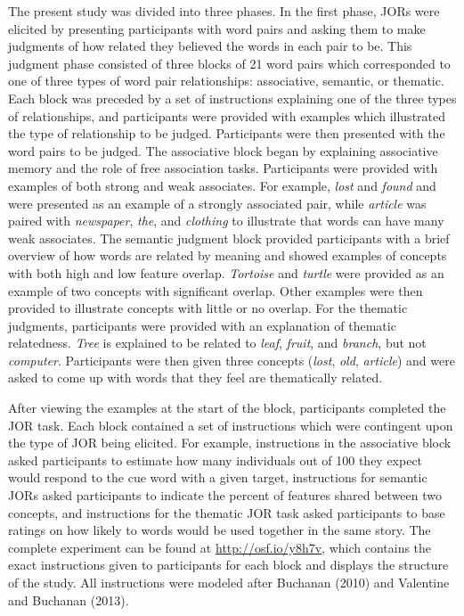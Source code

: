 \documentclass[english,,man]{apa6}
\begin{document}
The present study was divided into three phases. In the first phase,
JORs were elicited by presenting participants with word pairs and asking
them to make judgments of how related they believed the words in each
pair to be. This judgment phase consisted of three blocks of 21 word
pairs which corresponded to one of three types of word pair
relationships: associative, semantic, or thematic. Each block was
preceded by a set of instructions explaining one of the three types of
relationships, and participants were provided with examples which
illustrated the type of relationship to be judged. Participants were
then presented with the word pairs to be judged. The associative block
began by explaining associative memory and the role of free association
tasks. Participants were provided with examples of both strong and weak
associates. For example, \emph{lost} and \emph{found} and were presented
as an example of a strongly associated pair, while \emph{article} was
paired with \emph{newspaper}, \emph{the}, and \emph{clothing} to
illustrate that words can have many weak associates. The semantic
judgment block provided participants with a brief overview of how words
are related by meaning and showed examples of concepts with both high
and low feature overlap. \emph{Tortoise} and \emph{turtle} were provided
as an example of two concepts with significant overlap. Other examples
were then provided to illustrate concepts with little or no overlap. For
the thematic judgments, participants were provided with an explanation
of thematic relatedness. \emph{Tree} is explained to be related to
\emph{leaf}, \emph{fruit}, and \emph{branch}, but not \emph{computer}.
Participants were then given three concepts (\emph{lost}, \emph{old},
\emph{article}) and were asked to come up with words that they feel are
thematically related.

After viewing the examples at the start of the block, participants
completed the JOR task. Each block contained a set of instructions which
were contingent upon the type of JOR being elicited. For example,
instructions in the associative block asked participants to estimate how
many individuals out of 100 they expect would respond to the cue word
with a given target, instructions for semantic JORs asked participants
to indicate the percent of features shared between two concepts, and
instructions for the thematic JOR task asked participants to base
ratings on how likely to words would be used together in the same story.
The complete experiment can be found at \url{http://osf.io/y8h7v}, which
contains the exact instructions given to participants for each block and
displays the structure of the study. All instructions were modeled after
Buchanan (2010) and Valentine and Buchanan (2013).
\end{document}
